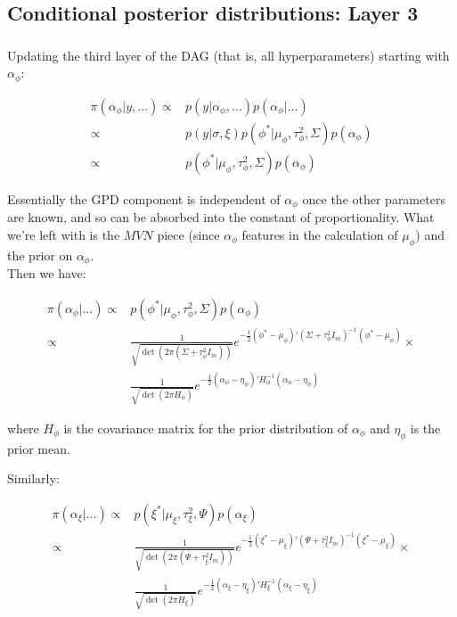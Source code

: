 \documentclass{article}
\begin{document}
\subsection*{Conditional posterior distributions: Layer 3}

\subsubsection*{\pmb{$\alpha$}}

Updating the third layer of the DAG (that is, all hyperparameters) starting with $\alpha_\phi$:

\begin{align*}
\pi(\alpha_\phi | y, \dots ) \propto & p(y | \alpha_\phi, \dots ) p(\alpha_\phi | \dots) \\
\propto & p(y | \sigma, \xi)  p(\phi^* | \mu_\phi, \tau^2_\phi, \Sigma) p(\alpha_\phi) \\
\propto & p(\phi^* | \mu_\phi, \tau^2_\phi, \Sigma) p(\alpha_\phi)
\end{align*}

Essentially the GPD component is independent of $\alpha_\phi$ once the other parameters are known, and so can be absorbed into the constant of proportionality. What we're left with is the $MVN$ piece (since $\alpha_\phi$ features in the calculation of $\mu_\phi$) and the prior on $\alpha_\phi$. \\

Then we have:

\begin{align*}
\pi(\alpha_\phi | \dots ) \propto & p(\phi^* | \mu_\phi, \tau^2_\phi, \Sigma) p(\alpha_\phi) \\
\propto & \frac{1}{\sqrt{\det(2 \pi (\Sigma + \tau^2_\phi I_m))}} e^{-\frac{1}{2} (\phi^* - \mu_\phi)' (\Sigma + \tau^2_\phi I_m)^{-1} (\phi^* - \mu_\phi) } \times \\
& \frac{1}{\sqrt{\det(2 \pi H_\phi)}} e^{-\frac{1}{2} (\alpha_\phi - \eta_\phi)' H_\phi^{-1} (\alpha_\phi - \eta_\phi) }
\end{align*}

where $H_\phi$ is the covariance matrix for the prior distribution of $\alpha_\phi$ and $\eta_\phi$ is the prior mean.

Similarly:

\begin{align*}
\pi(\alpha_\xi | \dots ) \propto & p(\xi^* | \mu_\xi, \tau^2_\xi, \Psi) p(\alpha_\xi) \\
\propto & \frac{1}{\sqrt{\det(2 \pi (\Psi + \tau^2_\xi I_m))}} e^{-\frac{1}{2} (\xi^* - \mu_\xi)' (\Psi + \tau^2_\xi I_m)^{-1} (\xi^* - \mu_\xi) } \times \\
& \frac{1}{\sqrt{\det(2 \pi H_\xi)}} e^{-\frac{1}{2} (\alpha_\xi - \eta_\xi)' H_\xi^{-1} (\alpha_\xi - \eta_\xi) }
\end{align*}
\end{document}
